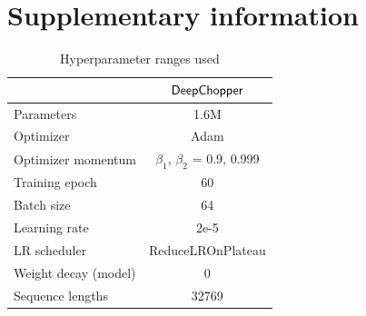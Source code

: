 \documentclass[pdflatex,sn-nature, lineno]{sn-jnl}%
\theoremstyle{thmstyleone}%
\theoremstyle{thmstyletwo}%
\theoremstyle{thmstylethree}%
\begin{document}



\newpage

\section{Supplementary information}

\renewcommand{\figurename}{Supplementary Fig.}
\renewcommand{\tablename}{Supplementary Table}




\begin{table}
	\centering
	\caption{Hyperparameter ranges used}\label{tab:hyperparameter}
	\begin{tabular}{lc}
		\toprule
		                     & {$\sf DeepChopper$}               \\
		\midrule
		Parameters           & 1.6M                              \\
		Optimizer            & Adam                             \\
		Optimizer momentum   & $\beta_1$, $\beta_2$ = 0.9, 0.999 \\
		Training epoch       & 60                                \\
		Batch size           & 64                                \\
		Learning rate        & 2e-5                     \\
		LR scheduler         & ReduceLROnPlateau                 \\
		Weight decay (model) & 0                         \\
		Sequence lengths     & 32769                             \\
		\midrule
	\end{tabular}
\end{table}
\end{document}
